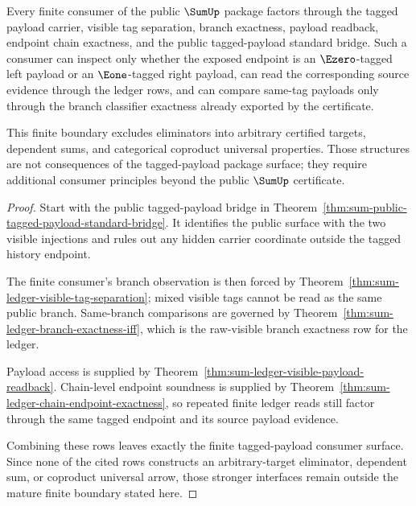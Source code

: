 \begin{theorem}
\label{thm:sum-mature-finite-consumer-boundary}
Every finite consumer of the public $\SumUp$ package factors through the tagged
payload carrier, visible tag separation, branch exactness, payload readback,
endpoint chain exactness, and the public tagged-payload standard bridge. Such a
consumer can inspect only whether the exposed endpoint is an $\Ezero$-tagged
left payload or an $\Eone$-tagged right payload, can read the corresponding
source evidence through the ledger rows, and can compare same-tag payloads only
through the branch classifier exactness already exported by the certificate.

This finite boundary excludes eliminators into arbitrary certified targets,
dependent sums, and categorical coproduct universal properties. Those structures
are not consequences of the tagged-payload package surface; they require
additional consumer principles beyond the public $\SumUp$ certificate.
\end{theorem}
\begin{proof}
Start with the public tagged-payload bridge in
Theorem~\ref{thm:sum-public-tagged-payload-standard-bridge}. It identifies the
public surface with the two visible injections and rules out any hidden carrier
coordinate outside the tagged history endpoint.

The finite consumer's branch observation is then forced by
Theorem~\ref{thm:sum-ledger-visible-tag-separation}; mixed visible tags cannot be
read as the same public branch. Same-branch comparisons are governed by
Theorem~\ref{thm:sum-ledger-branch-exactness-iff}, which is the raw-visible
branch exactness row for the ledger.

Payload access is supplied by
Theorem~\ref{thm:sum-ledger-visible-payload-readback}. Chain-level endpoint
soundness is supplied by
Theorem~\ref{thm:sum-ledger-chain-endpoint-exactness}, so repeated finite
ledger reads still factor through the same tagged endpoint and its source
payload evidence.

Combining these rows leaves exactly the finite tagged-payload consumer surface.
Since none of the cited rows constructs an arbitrary-target eliminator,
dependent sum, or coproduct universal arrow, those stronger interfaces remain
outside the mature finite boundary stated here.
\end{proof}


